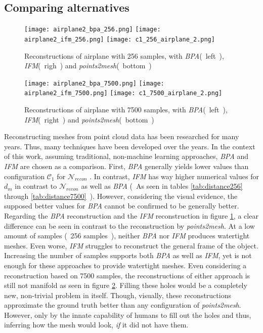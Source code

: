   \subsection*{Comparing alternatives}
  \begin{figure}[htbp]
    \centering
    \texttt{[image: airplane2\_bpa\_256.png]}
    \texttt{[image: airplane2\_ifm\_256.png]}
    \texttt{[image: c1\_256\_airplane\_2.png]}
    \caption{Reconstructions of airplane with 256 samples, with \emph{BPA}(~left~), \emph{IFM}(~righ~) and \emph{points2mesh}(~bottom~)} \label{fig:bpaifm}
  \end{figure}

  \begin{figure}[htbp]
    \centering
    \texttt{[image: airplane2\_bpa\_7500.png]}
    \texttt{[image: airplane2\_ifm\_7500.png]}
    \texttt{[image: c1\_7500\_airplane\_2.png]}
    \caption{Reconstructions of airplane with 7500 samples, with \emph{BPA}(~left~), \emph{IFM}(~right~) and \emph{points2mesh}(~bottom~)} \label{fig:bpaifmhigh}
  \end{figure}

  Reconstructing meshes from point cloud data has been researched for many years. Thus, many techniques have been developed over the years.
  In the context of this work, assuming traditional, non-machine learning approaches, \emph{BPA} and \emph{IFM} are chosen as a comparison.
  First, \emph{BPA} generally yields lower values than configuration $\mathcal{C}_1$ for $\mathcal{N}_{recon}$ . In contrast, \emph{IFM} has 
  way higher numerical values for $d_m$ in contrast to $\mathcal{N}_{recon}$ as well as \emph{BPA} (~As seen in tables \ref{tab:distance256} through \ref{tab:distance7500}~).
  However, considering the visual evidence, the supposed better values for \emph{BPA} cannot be confirmed to be generally better.
  Regarding the \emph{BPA} reconstruction and the \emph{IFM} reconstruction in figure \ref{fig:bpaifm}, a clear difference
  can be seen in contrast to the reconstruction by \emph{points2mesh}. At a low amount of samples (~256 samples~), 
  neither \emph{BPA} nor \emph{IFM} produces watertight meshes. Even worse, \emph{IFM} struggles to reconstruct the general frame of the object. 
  Increasing the number of samples supports both \emph{BPA} as well as \emph{IFM}, yet is not enough for these approaches to provide watertight meshes.
  Even considering a reconstruction based on 7500 samples, the reconstructions of either approach is still not manifold as seen in figure \ref{fig:bpaifmhigh}.
  Filling these holes would be a completely new, non-trivial problem in itself. Though, visually, these reconstructions approximate the ground truth better 
  than any configuration of \emph{points2mesh}. However, only by the innate capability of humans to fill out the holes and thus, inferring how the mesh would
  look, \emph{if} it did not have them.

